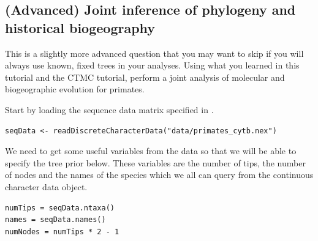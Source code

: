 \subsection{(Advanced) Joint inference of phylogeny and historical biogeography}
This is a slightly more advanced question that you may want to skip if you will always use known, fixed trees in your analyses.
Using what you learned in this tutorial and the CTMC tutorial, perform a joint analysis of molecular and biogeographic evolution for primates. 

Start by loading the sequence data matrix specified in .
{\tt \begin{snugshade*}
\begin{lstlisting}
seqData <- readDiscreteCharacterData("data/primates_cytb.nex")
\end{lstlisting}
\end{snugshade*}}

We need to get some useful variables from the data so that we will be able to specify the tree prior below. These variables are the number of tips, the number of nodes and the names of the species which we all can query from the continuous character data object.
{\tt \small \begin{snugshade*}
\begin{lstlisting}
numTips = seqData.ntaxa()
names = seqData.names()
numNodes = numTips * 2 - 1
\end{lstlisting}
\end{snugshade*}}

